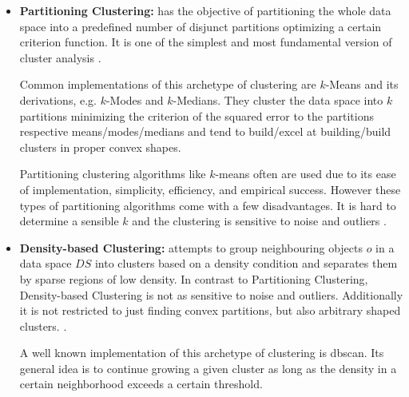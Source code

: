 \begin{itemize}
    \item \textbf{Partitioning Clustering:} has the objective of partitioning the whole data space into a predefined number of disjunct partitions optimizing a certain criterion function. It is one of the simplest and most fundamental version of cluster analysis \cite[Chapter 10.2]{han2011data}.
    
    Common implementations of this archetype of clustering are $k$-Means\cite{kmeansmacqueen1967some} and its derivations, e.g. $k$-Modes and $k$-Medians\cite{kmeanshalfcenturysteinley2006k}. They cluster the data space into $k$ partitions minimizing the criterion of the squared error to the partitions respective means/modes/medians and tend to build/excel at building/build clusters in proper convex shapes\cite{clusteringsurveyberkhin2006survey}. 
    
    Partitioning clustering algorithms like $k$-means often are  used due to its ease of implementation, simplicity, efficiency, and empirical success\cite{kmeans50jain2010data}.
    However these types of partitioning algorithms come with a few disadvantages. It is hard to determine a sensible $k$ and the clustering is sensitive to noise and outliers \cite{dataclusteringreviewjain1999data}. 
    
    \item \textbf{Density-based Clustering:} attempts to group neighbouring objects $o$ in a data space $DS$ into clusters based on a density condition and separates them by sparse regions of low density. In contrast to Partitioning Clustering, Density-based Clustering is not as sensitive to noise and outliers. Additionally it is not restricted to just finding convex partitions, but also arbitrary shaped clusters. \cite[Chapter 10.4]{han2011data}.
    
    A well known implementation of this archetype of clustering is \acrshort{dbscan}\cite{DBSCANEKSX96}. Its general idea is to continue growing a given cluster as long as the density in a certain neighborhood exceeds a certain threshold. 
    

\end{itemize}
